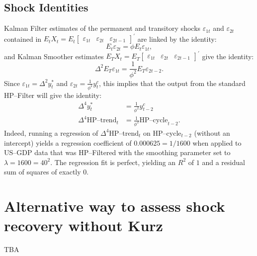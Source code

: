 \documentclass[a4paper,12pt]{article}
\begin{document}
\subsection{Shock Identities}

Kalman Filter estimates of the permanent and transitory shocks $\varepsilon
_{1t}$ and $\varepsilon _{2t}$ contained in $E_{t}X_{t}=E_{t}%
\begin{bmatrix}
\varepsilon _{1t} & \varepsilon _{2t} & \varepsilon _{2t-1}%
\end{bmatrix}%
^{\prime }$ are linked by the identity:%
\begin{equation*}
E_{t}\varepsilon _{2t}=\phi E_{t}\varepsilon _{1t},
\end{equation*}%
and Kalman Smoother estimates $E_{T}X_{t}=E_{T}%
\begin{bmatrix}
\varepsilon _{1t} & \varepsilon _{2t} & \varepsilon _{2t-1}%
\end{bmatrix}%
^{\prime }$ give the identity: 
\begin{equation}
\Delta ^{2}E_{T}\varepsilon _{1t}=\frac{1}{\phi ^{2}}E_{T}\varepsilon
_{2t-2}.  \label{KS}
\end{equation}%
Since $\varepsilon _{1t}=\Delta ^{2}y_{t}^{\ast }$ and $\varepsilon _{2t}=%
\frac{1}{\phi ^{2}}y_{t}^{c}$, this implies that the output from the
standard HP--Filter will give the identity:%
\begin{align*}
\Delta ^{4}y_{t}^{\ast }& =\frac{1}{\phi ^{2}}y_{t-2}^{c} \\
\Delta ^{4}\text{HP--trend}_{t}& =\frac{1}{\phi ^{2}}\text{HP--cycle}_{t-2}.
\end{align*}%
Indeed, running a regression of $\Delta ^{4}$HP--trend$_{t}$ on HP--cycle$%
_{t-2}$ (without an intercept) yields a regression coefficient of $%
0.000625=1/1600$ when applied to US--GDP data that was HP--Filtered with the
smoothing parameter set to $\lambda =1600=40^{2}$. The regression fit is
perfect, yielding an $R^{2}$ of $1$ and a residual sum of squares of exactly 
$0$.

\section{Alternative way to assess shock recovery without Kurz}

TBA
\end{document}
